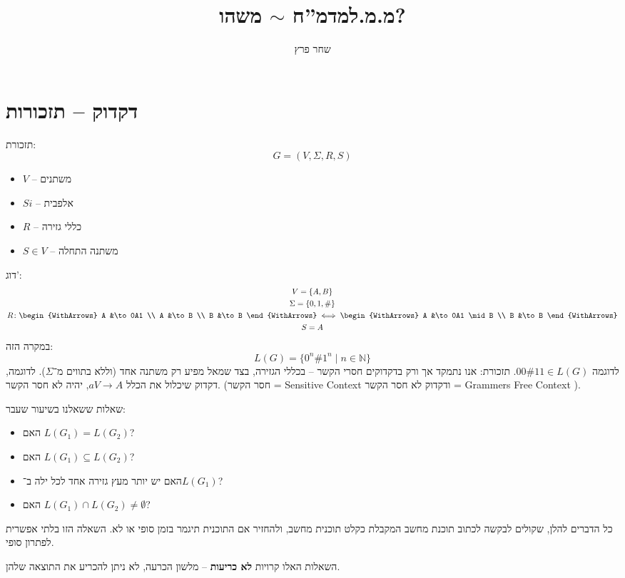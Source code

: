 \documentclass[]{article}
\author{שחר פרץ}
\title{מ.מ.למדמ''ח $\sim$ משהו?}
\newcommand\del   {$ \!\! $}
\newcommand\N     {\mathbb{N}}
\newcommand\Si    {\Sigma}
\begin{document}
	\maketitle
	\section{דקדוק – תזכורות}
	תזכורת: 
	\[ G = (V, \Si, R, S) \]
	\begin{itemize}
		\item $V$ -- משתנים
		\item $Si$ -- אלפבית
		\item $R$ -- כללי גזירה
		\item $S \in V$ -- משתנה התחלה
	
	\end{itemize}	דוג': 
	\begin{gather}
	V = \{A, B\} \\
	\Si = \{0, 1, \#\}\\
	R \colon \begin{WithArrows}
		A &\to 0A1 \\
		A &\to B \\
		B &\to B 
	\end{WithArrows} \iff \begin{WithArrows}
		A &\to 0A1 \mid B \\
		B &\to B 
	\end{WithArrows}\\
	S = A
	\end{gather}
	במקרה הזה: 
	\[ L(G) = \{0^n\#1^n \mid n \in \N\} \]
	לדוגמה $00\#11 \in L(G)$. 
	תזכורת: אנו נתמקד אך ורק בדקדוקים חסרי הקשר – בכללי הגזירה, בצד שמאל מפיע רק משתנה אחד (וללא בתווים מ־$\Si$). לדוגמה, דקדוק שיכלול את הכלל $aV \to A$, יהיה לא חסר הקשר. (חסר הקשר = Sensitive Context ודקדוק לא חסר הקשר = Grammers Free Context \del). 
	
	שאלות ששאלנו בשיעור שעבר: 
	\begin{itemize}
		\item האם $L(G_1) = L(G_2)$?
		\item האם $L(G_1) \subseteq L(G_2)$?
		\item האם יש יותר מעץ גזירה אחד לכל ילה ב־$L(G_1)$?
		\item האם $L(G_1) \cap L(G_2) \neq \emptyset$?
	\end{itemize}
	כל הדברים להלן, שקולים לבקשה לכתוב תוכנת מחשב המקבלת כקלט תוכנית מחשב, ולהחזיר אם התוכנית תיגמר בזמן סופי או לא. השאלה הזו בלתי אפשרית לפתרון סופי. 
	
	השאלות האלו קרויות \textbf{לא כריעות} – מלשון הכרעה, לא ניתן להכריע את התוצאה שלהן. 
	
\end{document}

